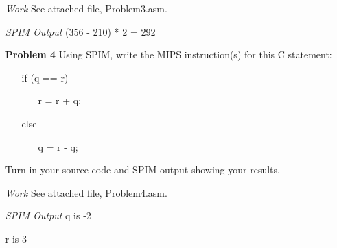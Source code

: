 \documentclass[12pt]{article}
\begin{document}
\begin{enumerate}
  \item[\textit{Work}] See attached file, Problem3.asm.
  \item[\textit{SPIM Output}] (356 - 210) * 2 = 292
\end{enumerate}




\begin{enumerate}
  \item[\textbf{Problem 4}] Using SPIM, write the MIPS instruction(s) for this C statement:
  \begin{enumerate}\ttfamily
    \item[] if  (q == r)
    \begin{enumerate}
      \item[] r = r + q;
    \end{enumerate}
    \item[] else
    \begin{enumerate}
      \item[] q = r - q;
    \end{enumerate}
  \end{enumerate}
	\item[]Turn in your source code and SPIM output showing your results.
\end{enumerate}

\begin{enumerate}
  \item[\textit{Work}] See attached file, Problem4.asm.
  \item[\textit{SPIM Output}] q is -2
  \item[] r is 3
\end{enumerate}
\end{document}
